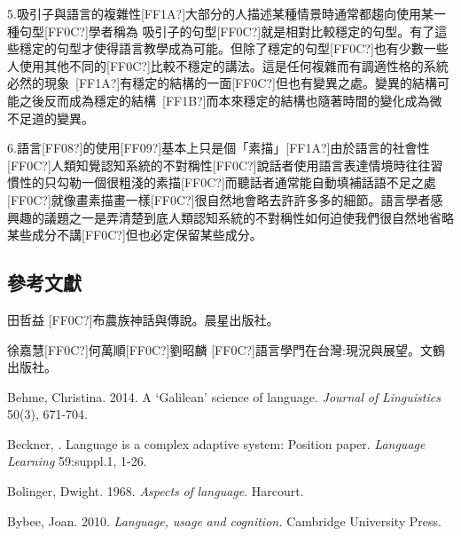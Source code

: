 5.吸引子與語言的複雜性[FF1A?]大部分的人描述某種情景時通常都趨向使用某一種句型[FF0C?]學者稱為 吸引子的句型[FF0C?]就是相對比較穩定的句型。有了這些穩定的句型才使得語言教學成為可能。但除了穩定的句型[FF0C?]也有少數一些人使用其他不同的[FF0C?]比較不穩定的講法。這是任何複雜而有調適性格的系統必然的現象~[FF1A?]有穩定的結構的一面[FF0C?]但也有變異之處。變異的結構可能之後反而成為穩定的結構~[FF1B?]而本來穩定的結構也隨著時間的變化成為微不足道的變異。

6.語言[FF08?]的使用[FF09?]基本上只是個「素描」[FF1A?]由於語言的社會性[FF0C?]人類知覺認知系統的不對稱性[FF0C?]說話者使用語言表達情境時往往習慣性的只勾勒一個很粗淺的素描[FF0C?]而聽話者通常能自動填補話語不足之處[FF0C?]就像畫素描畫一樣[FF0C?]很自然地會略去許許多多的細節。語言學者感興趣的議題之一是弄清楚到底人類認知系統的不對稱性如何迫使我們很自然地省略某些成分不講[FF0C?]但也必定保留某些成分。  

\subsection{參考文獻}  %
\begin{stylereferences}
田哲益 [FF0C?]布農族神話與傳說。晨星出版社。
\end{stylereferences}

\begin{stylereferences}
徐嘉慧[FF0C?]何萬順[FF0C?]劉昭麟 [FF0C?]語言學門在台灣:現況與展望。文鶴出版社。
\end{stylereferences}

\begin{stylereferences}
Behme, Christina. 2014. A ‘Galilean’ science of language. \textit{Journal} \textit{of} \textit{Linguistics} 50(3), 671-704.
\end{stylereferences}

\begin{stylereferences}
Beckner, \citealt{ClayEtAl2009}. Language is a complex adaptive system: Position paper. \textit{Language} \textit{Learning} 59:suppl.1, 1-26.
\end{stylereferences}

\begin{stylereferences}
Bolinger, Dwight. 1968. \textit{Aspects} \textit{of} \textit{language}. Harcourt. 
\end{stylereferences}

\begin{stylereferences}
Bybee, Joan. 2010. \textit{Language,} \textit{usage} \textit{and} \textit{cognition.} Cambridge University Press.
\end{stylereferences}

